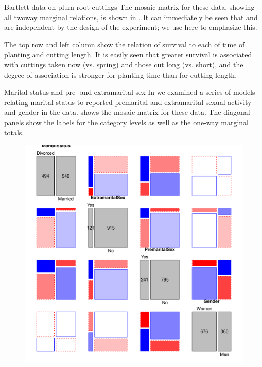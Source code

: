 \documentclass[11pt]{book}
\renewenvironment{knitrout}{\small\renewcommand{\baselinestretch}{.85}}{} %
\begin{document}
\begin{Example}[bartlett]{Bartlett data on plum root cuttings}
\begin{knitrout}
\end{knitrout}
The mosaic matrix for these data, showing all twoway marginal relations, is shown
in . 
It can immediately be seen that  and  are independent
by the design of the experiment; we use  here to emphasize
this.

The top row and left column show the relation of survival to each of time of planting
and cutting length.  It is easily seen that greater survival is associated with
cuttings taken now (vs. spring) and those cut long (vs. short),
and the degree of association is stronger for planting time than for cutting length.
\end{Example}

\begin{Example}[marital2]{Marital status and pre- and extramarital sex}
In  we examined a series of models relating marital
status to reported premarital and extramarital sexual activity and gender in the
 data.
 shows the mosaic matrix for these data.
The diagonal panels show the labels for the category levels as well as
the one-way marginal totals.

\begin{knitrout}
\color{fgcolor}\begin{kframe}
\begin{alltt}
\hlstd{(}\hlstd{,} \hlstd{=}\hlstd{)}
  \hlstd{=}\hlstd{(}\hlstd{=}\hlopt{:}\hlstd{),} \hlstd{=}\hlstd{)}
\end{alltt}
\end{kframe}\begin{figure}[!htb]


\centerline{\includegraphics[width=.8\textwidth]{ch05/fig/marital-pairs} }


\end{figure}
\end{knitrout}
\end{Example}
\end{document}
